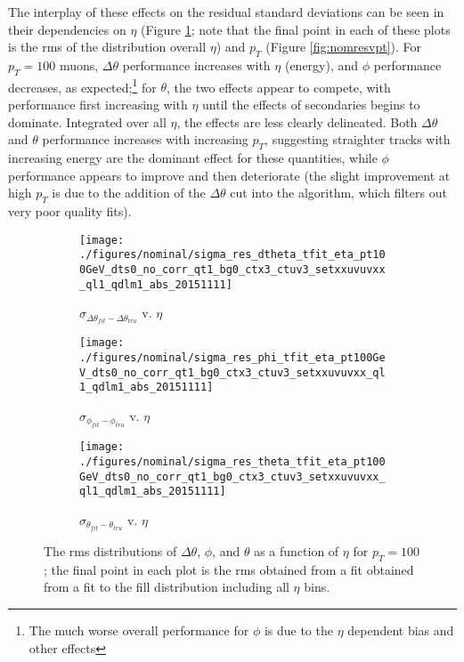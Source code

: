 The interplay of these effects on the residual standard deviations can be seen in their dependencies on  $\eta$ (Figure \ref{fig:nomresveta}; note that the final point in each of these plots is the rms of the distribution overall $\eta$) and $p_T$ (Figure \ref{fig:nomresvpt}).  For $p_T=100$ \GeV muons, $\Delta\theta$ performance increases with $\eta$ (energy), and $\phi$ performance decreases, as expected;\footnote{The much worse overall performance for $\phi$ is due to the $\eta$ dependent bias and other effects} for $\theta$, the two effects appear to compete, with performance first increasing with $\eta$ until the effects of secondaries begins to dominate.  Integrated over all $\eta$, the effects are less clearly delineated.  Both $\Delta\theta$ and $\theta$ performance increases with increasing $p_T$, suggesting straighter tracks with increasing energy are the dominant effect for these quantities, while $\phi$ performance appears to improve and then deteriorate (the slight improvement at high $p_T$ is due to the addition of the $\Delta\theta$ cut into the algorithm, which filters out very poor quality fits).

\begin{figure}[!htbp]\captionsetup{justification=centering}\captionsetup{justification=centering}
  \begin{center}
    \begin{subfigure}{0.3\textwidth}\texttt{[image: ./figures/nominal/sigma\_res\_dtheta\_tfit\_eta\_pt100GeV\_dts0\_no\_corr\_qt1\_bg0\_ctx3\_ctuv3\_setxxuvuvxx\_ql1\_qdlm1\_abs\_20151111]}\caption{$\sigma_{\Delta\theta_{fit}-\Delta\theta_{tru}}$ v. $\eta$}\end{subfigure}
    \begin{subfigure}{0.3\textwidth}\texttt{[image: ./figures/nominal/sigma\_res\_phi\_tfit\_eta\_pt100GeV\_dts0\_no\_corr\_qt1\_bg0\_ctx3\_ctuv3\_setxxuvuvxx\_ql1\_qdlm1\_abs\_20151111]}\caption{$\sigma_{\phi_{fit}-\phi_{tru}}$ v. $\eta$}\end{subfigure}
    \begin{subfigure}{0.3\textwidth}\texttt{[image: ./figures/nominal/sigma\_res\_theta\_tfit\_eta\_pt100GeV\_dts0\_no\_corr\_qt1\_bg0\_ctx3\_ctuv3\_setxxuvuvxx\_ql1\_qdlm1\_abs\_20151111]}\caption{$\sigma_{\theta_{fit}-\theta_{tru}}$ v. $\eta$}\end{subfigure}
    \caption{\label{fig:nomresveta} The rms distributions of $\Delta\theta$, $\phi$, and $\theta$ as a function of $\eta$ for $p_T=100$ \GeV; the final point in each plot is the rms obtained from a fit obtained from a fit to the fill distribution including all $\eta$ bins.}
  \end{center}
\end{figure}

